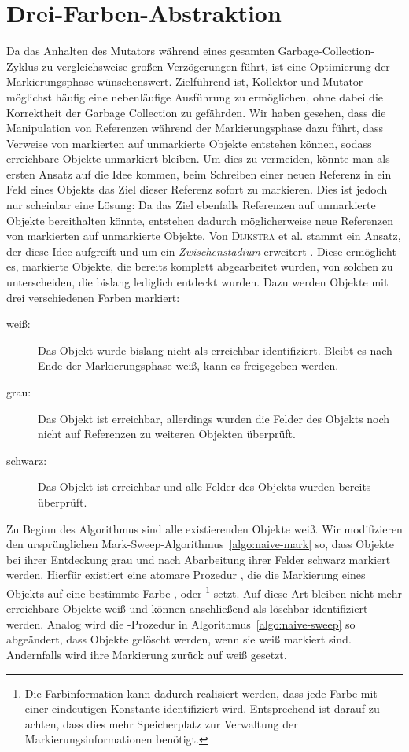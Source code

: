 \section{Drei-Farben-Abstraktion}
\label{sec:tricolor}
Da das Anhalten des Mutators während eines gesamten Garbage-Collection-Zyklus zu vergleichsweise großen Verzögerungen führt, ist eine Optimierung der Markierungsphase wünschenswert.
Zielführend ist, Kollektor und Mutator möglichst häufig eine nebenläufige Ausführung zu ermöglichen, ohne dabei die Korrektheit der Garbage Collection zu gefährden.
Wir haben gesehen, dass die Manipulation von Referenzen während der Markierungsphase dazu führt, dass Verweise von markierten auf unmarkierte Objekte entstehen können, sodass erreichbare Objekte unmarkiert bleiben.
Um dies zu vermeiden, könnte man als ersten Ansatz auf die Idee kommen, beim Schreiben einer neuen Referenz in ein Feld eines Objekts das Ziel dieser Referenz sofort zu markieren.
Dies ist jedoch nur scheinbar eine Lösung:
Da das Ziel ebenfalls Referenzen auf unmarkierte Objekte bereithalten könnte, entstehen dadurch möglicherweise neue Referenzen von markierten auf unmarkierte Objekte.
Von \textsc{Dijkstra} et al. stammt ein Ansatz, der diese Idee aufgreift und um ein \textit{Zwischenstadium} erweitert \cite[S. 969f]{dijkstra1978}.
Diese ermöglicht es, markierte Objekte, die bereits komplett abgearbeitet wurden, von solchen zu unterscheiden, die bislang lediglich entdeckt wurden.
Dazu werden Objekte mit drei verschiedenen Farben markiert:

\begin{description}
	\item[weiß:] Das Objekt wurde bislang nicht als erreichbar identifiziert.
		Bleibt es nach Ende der Markierungsphase weiß, kann es freigegeben werden.
	\item[grau:] Das Objekt ist erreichbar, allerdings wurden die Felder des Objekts noch nicht auf Referenzen zu weiteren Objekten überprüft.
	\item[schwarz:] Das Objekt ist erreichbar und alle Felder des Objekts wurden bereits überprüft.
\end{description}

Zu Beginn des Algorithmus sind alle existierenden Objekte weiß.
Wir modifizieren den ursprünglichen Mark-Sweep-Algorithmus~\ref{algo:naive-mark} so, dass Objekte bei ihrer Entdeckung grau und nach Abarbeitung ihrer Felder schwarz markiert werden.
Hierfür existiert eine atomare Prozedur , die die Markierung eines Objekts auf eine bestimmte Farbe ,  oder \footnote{Die Farbinformation kann dadurch realisiert werden, dass jede Farbe mit einer eindeutigen Konstante identifiziert wird. Entsprechend ist darauf zu achten, dass dies mehr Speicherplatz zur Verwaltung der Markierungsinformationen benötigt.} setzt.
Auf diese Art bleiben nicht mehr erreichbare Objekte weiß und können anschließend als löschbar identifiziert werden.
Analog wird die -Prozedur in Algorithmus~\ref{algo:naive-sweep} so abgeändert, dass Objekte gelöscht werden, wenn sie weiß markiert sind.
Andernfalls wird ihre Markierung zurück auf weiß gesetzt.

